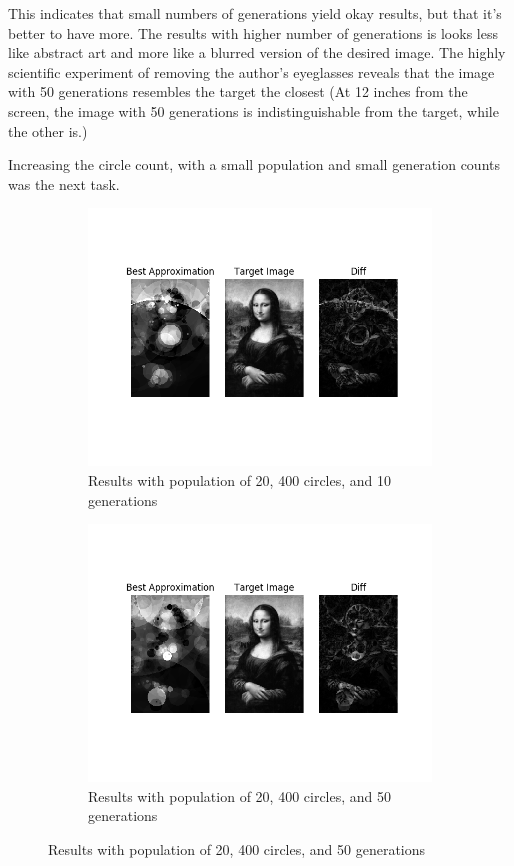 \documentclass{article}
\begin{document}
This indicates that small numbers of generations yield okay results, but that it's better to have
more. The results with higher number of generations is looks less like abstract art and more like a
blurred version of the desired image. The highly scientific experiment of removing the author's
eyeglasses reveals that the image with 50 generations resembles the target the closest (At 12
inches from the screen, the image with 50 generations is indistinguishable from the target, while
the other is.)

Increasing the circle count, with a small population and small generation counts was the next task.

\begin{figure}[H]
    \centering
    \begin{subfigure}[b]{0.45\textwidth}
        \centering
        \includegraphics[width=\textwidth]{output/bs-p20c400g10.png}
        \caption{Results with population of 20, 400 circles, and 10 generations}
    \end{subfigure}
    \begin{subfigure}[b]{0.45\textwidth}
        \centering
        \includegraphics[width=\textwidth]{output/bs-p20c400g50.png}
        \caption{Results with population of 20, 400 circles, and 50 generations}
    \end{subfigure}
\end{figure}
\end{document}
